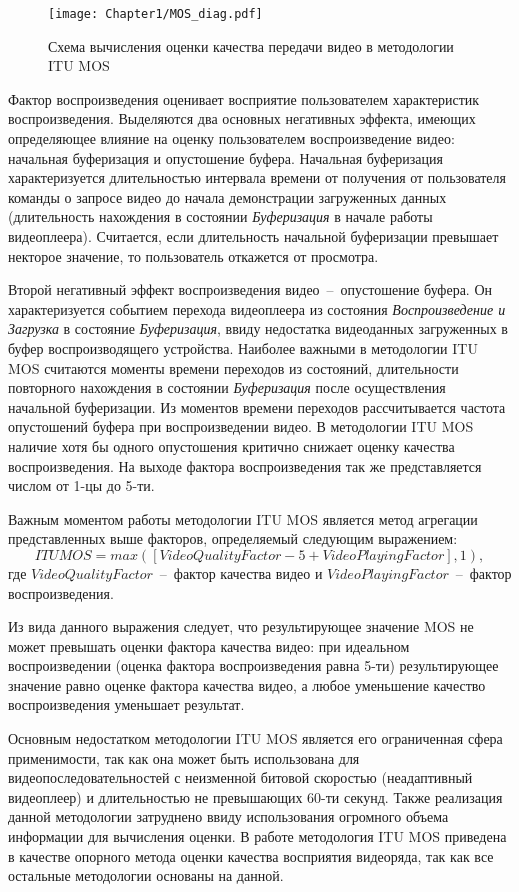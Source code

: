 \begin{figure}[htbp]
\begin{center}
\texttt{[image: Chapter1/MOS\_diag.pdf]}
\caption{Схема вычисления оценки качества передачи видео в методологии ITU MOS}
\label{fig:MOS_diag}
\end{center}
\end{figure}

Фактор воспроизведения оценивает восприятие пользователем характеристик воспроизведения. Выделяются два основных негативных эффекта, имеющих определяющее влияние на оценку пользователем воспроизведение видео: начальная буферизация и опустошение буфера. Начальная буферизация характеризуется длительностью интервала времени от получения от пользователя команды о запросе видео до начала демонстрации загруженных данных (длительность нахождения в состоянии \textit{Буферизация} в начале работы видеоплеера). Считается, если длительность начальной буферизации превышает некторое значение, то пользователь откажется от просмотра.

Второй негативный эффект воспроизведения видео~--~опустошение буфера. Он характеризуется событием перехода видеоплеера из состояния \textit{Воспроизведение и Загрузка} в состояние \textit{Буферизация}, ввиду недостатка видеоданных загруженных в буфер воспроизводящего устройства. Наиболее важными в методологии ITU MOS считаются моменты времени переходов из состояний, длительности повторного нахождения в состоянии \textit{Буферизация} после осуществления начальной буферизации. Из моментов времени переходов рассчитывается частота опустошений буфера при воспроизведении видео. В методологии ITU MOS наличие хотя бы одного опустошения критично снижает оценку качества воспроизведения. На выходе фактора воспроизведения так же представляется числом от 1-цы до 5-ти.

Важным моментом работы методологии ITU MOS является метод агрегации представленных выше факторов, определяемый следующим выражением:
$$ITU MOS = max ([VideoQualityFactor - 5 + VideoPlayingFactor], 1 ),$$
где $VideoQualityFactor$~--~фактор качества видео и $VideoPlayingFactor$~--~фактор воспроизведения.

Из вида данного выражения следует, что результирующее значение MOS не может превышать оценки фактора качества видео: при идеальном воспроизведении (оценка фактора воспроизведения равна 5-ти) результирующее значение равно оценке фактора качества видео, а любое уменьшение качество воспроизведения уменьшает результат.

Основным недостатком методологии ITU MOS является его ограниченная сфера применимости, так как она может быть использована для видеопоследовательностей с неизменной битовой скоростью (неадаптивный видеоплеер) и длительностью не превышающих 60-ти секунд. Также реализация данной методологии затруднено ввиду использования огромного объема информации для вычисления оценки. В работе методология ITU MOS приведена в качестве опорного метода оценки качества восприятия видеоряда, так как все остальные методологии основаны на данной.

